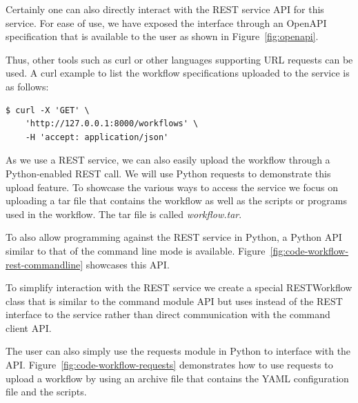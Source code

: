 Certainly one can also directly interact with the REST service API for
this service. For ease of use, we have exposed the interface through
an OpenAPI specification that is available to the user as shown in
Figure~\ref{fig:openapi}.

Thus, other tools such as curl or other languages supporting URL
requests can be used. A curl example to list the workflow
specifications uploaded to the service is as follows:

\begin{verbatim}
$ curl -X 'GET' \
    'http://127.0.0.1:8000/workflows' \
    -H 'accept: application/json'
\end{verbatim}

As we use a REST service, we can also easily upload the workflow
through a Python-enabled REST call. We will use Python requests to
demonstrate this upload feature. To showcase the various ways to
access the service we focus on uploading a tar file that contains the
workflow as well as the scripts or programs used in the workflow. The
tar file is called {\em workflow.tar}.

To also allow programming against the REST service in Python, a Python
API similar to that of the command line mode is
available. Figure~\ref{fig:code-workflow-rest-commandline} showcases
this API.

To simplify interaction with the REST service we create a special
RESTWorkflow class that is similar to the command module API but uses
instead of the REST interface to the service rather than direct
communication with the command client API.

The user can also simply use the requests module in Python to
interface with the API. Figure~\ref{fig:code-workflow-requests}
demonstrates how to use requests to upload a workflow by using
an archive file that contains the YAML configuration file and the scripts.


